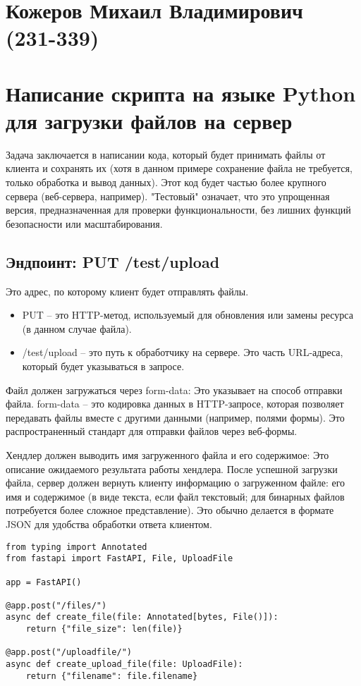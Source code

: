 \documentclass[a4paper,12pt]{article}
\begin{document}
\section*{Кожеров Михаил Владимирович (231-339)}

\section*{Написание скрипта на языке Python для загрузки файлов на сервер}

Задача заключается в написании кода, который будет принимать файлы от клиента и сохранять их (хотя в данном примере сохранение файла не требуется, только обработка и вывод данных). Этот код будет частью более крупного сервера (веб-сервера, например). "Тестовый" означает, что это упрощенная версия, предназначенная для проверки функциональности, без лишних функций безопасности или масштабирования.

\subsection*{Эндпоинт: PUT /test/upload}
Это адрес, по которому клиент будет отправлять файлы.

\begin{itemize}
    \item PUT -- это HTTP-метод, используемый для обновления или замены ресурса (в данном случае файла).
    \item /test/upload -- это путь к обработчику на сервере. Это часть URL-адреса, который будет указываться в запросе.
\end{itemize}

Файл должен загружаться через form-data: Это указывает на способ отправки файла. form-data -- это кодировка данных в HTTP-запросе, которая позволяет передавать файлы вместе с другими данными (например, полями формы). Это распространенный стандарт для отправки файлов через веб-формы.

Хендлер должен выводить имя загруженного файла и его содержимое: Это описание ожидаемого результата работы хендлера. После успешной загрузки файла, сервер должен вернуть клиенту информацию о загруженном файле: его имя и содержимое (в виде текста, если файл текстовый; для бинарных файлов потребуется более сложное представление). Это обычно делается в формате JSON для удобства обработки ответа клиентом.

\begin{verbatim}
from typing import Annotated
from fastapi import FastAPI, File, UploadFile

app = FastAPI()

@app.post("/files/")
async def create_file(file: Annotated[bytes, File()]):
    return {"file_size": len(file)}

@app.post("/uploadfile/")
async def create_upload_file(file: UploadFile):
    return {"filename": file.filename}
\end{verbatim}
\end{document}
